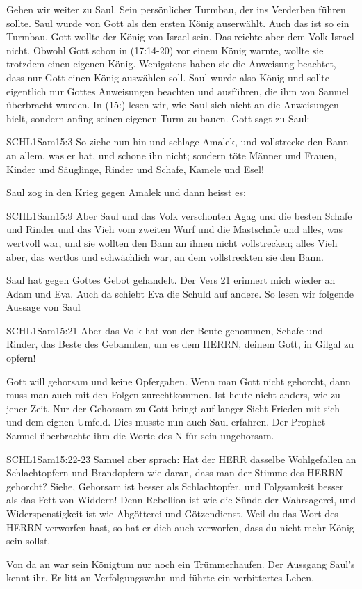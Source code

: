 \documentclass[14pt]{../../inc/mybib}
\newenvironment{block}[1][]{%
  \vspace{1.5em}%
  \noindent\textbf{#1}\par%
  \vspace{0.0em}%
}{%
  \vspace{1em}%
}
\begin{document}
\begin{block}
    Gehen wir weiter zu Saul. Sein persönlicher Turmbau, der ins Verderben führen sollte. Saul wurde von Gott als den ersten König auserwählt. Auch das ist so ein Turmbau. Gott wollte der König von Israel sein. Das reichte aber dem Volk Israel nicht. Obwohl Gott schon in (17:14-20) vor einem König warnte, wollte sie trotzdem einen eigenen König. Wenigstens haben sie die Anweisung beachtet, dass nur Gott einen König auswählen soll. Saul wurde also König und sollte eigentlich nur Gottes Anweisungen beachten und ausführen, die ihm von Samuel überbracht wurden. In (15:) lesen wir, wie Saul sich nicht an die Anweisungen hielt, sondern anfing seinen eigenen Turm zu bauen. Gott sagt zu Saul:
    \begin{bibelbox}{SCHL}{1Sam}{15:3}
        So ziehe nun hin und schlage Amalek, und vollstrecke den Bann an allem, was er hat, und schone ihn nicht; sondern töte Männer und Frauen, Kinder und Säuglinge, Rinder und Schafe, Kamele und Esel!
    \end{bibelbox}
    Saul zog in den Krieg gegen Amalek und dann heisst es:
    \begin{bibelbox}{SCHL}{1Sam}{15:9}
        Aber Saul und das Volk verschonten Agag und die besten Schafe und Rinder und das Vieh vom zweiten Wurf und die Mastschafe und alles, was wertvoll war, und sie wollten den Bann an ihnen nicht vollstrecken; alles Vieh aber, das wertlos und schwächlich war, an dem vollstreckten sie den Bann.
    \end{bibelbox}
    Saul hat gegen Gottes Gebot gehandelt. Der Vers 21 erinnert mich wieder an Adam und Eva. Auch da schiebt Eva die Schuld auf andere. So lesen wir folgende Aussage von Saul
    \begin{bibelbox}{SCHL}{1Sam}{15:21}
        Aber das Volk hat von der Beute genommen, Schafe und Rinder, das Beste des Gebannten, um es dem HERRN, deinem Gott, in Gilgal zu opfern!
    \end{bibelbox}
    Gott will gehorsam und keine Opfergaben. Wenn man Gott nicht gehorcht, dann muss man auch mit den Folgen zurechtkommen. Ist heute nicht anders, wie zu jener Zeit. Nur der Gehorsam zu Gott bringt auf langer Sicht Frieden mit sich und dem eignen Umfeld. Dies musste nun auch Saul erfahren. Der Prophet Samuel überbrachte ihm die Worte des \herr N für sein ungehorsam.    
    \begin{bibelbox}{SCHL}{1Sam}{15:22-23}
        Samuel aber sprach: Hat der HERR dasselbe Wohlgefallen an Schlachtopfern und Brandopfern wie daran, dass man der Stimme des HERRN gehorcht? Siehe, Gehorsam ist besser als Schlachtopfer, und Folgsamkeit besser als das Fett von Widdern! Denn Rebellion ist wie die Sünde der Wahrsagerei, und Widerspenstigkeit ist wie Abgötterei und Götzendienst. Weil du das Wort des HERRN verworfen hast, so hat er dich auch verworfen, dass du nicht mehr König sein sollst.
    \end{bibelbox} 
    Von da an war sein Königtum nur noch ein Trümmerhaufen. Der Aussgang Saul's kennt ihr. Er litt an Verfolgungswahn und führte ein verbittertes Leben.
\end{block}
\end{document}
